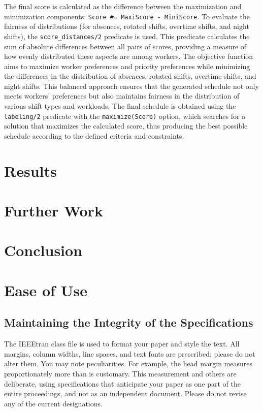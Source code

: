 \documentclass[conference]{IEEEtran}
\begin{document}
The final score is calculated as the difference between the maximization and minimization components: \texttt{Score \#= MaxiScore - MiniScore}.
To evaluate the fairness of distributions (for absences, rotated shifts, overtime shifts, and night shifts), the \texttt{score\_distances/2} predicate is used. This predicate calculates the sum of absolute differences between all pairs of scores, providing a measure of how evenly distributed these aspects are among workers.
The objective function aims to maximize worker preferences and priority preferences while minimizing the differences in the distribution of absences, rotated shifts, overtime shifts, and night shifts. This balanced approach ensures that the generated schedule not only meets workers' preferences but also maintains fairness in the distribution of various shift types and workloads.
The final schedule is obtained using the \texttt{labeling/2} predicate with the \texttt{maximize(Score)} option, which searches for a solution that maximizes the calculated score, thus producing the best possible schedule according to the defined criteria and constraints.

\section{Results}
\label{section:results}

\section{Further Work}
\label{section:further-work}

\section{Conclusion}
\label{section:conclusion}

\color{red}
\section{Ease of Use}

\subsection{Maintaining the Integrity of the Specifications}

The IEEEtran class file is used to format your paper and style the text. All margins, 
column widths, line spaces, and text fonts are prescribed; please do not 
alter them. You may note peculiarities. For example, the head margin
measures proportionately more than is customary. This measurement 
and others are deliberate, using specifications that anticipate your paper 
as one part of the entire proceedings, and not as an independent document. 
Please do not revise any of the current designations.
\end{document}
